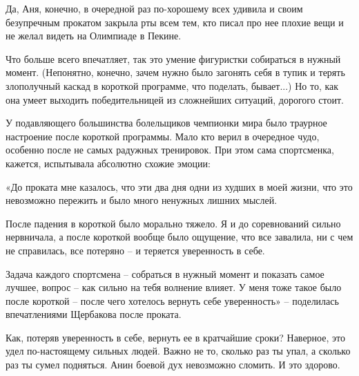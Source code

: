 Да, Аня, конечно, в очередной раз по-хорошему всех удивила и своим безупречным
прокатом закрыла рты всем тем, кто писал про нее плохие вещи и не желал видеть
на Олимпиаде в Пекине.

Что больше всего впечатляет, так это умение фигуристки собираться в нужный
момент. (Непонятно, конечно, зачем нужно было загонять себя в тупик и терять
злополучный каскад в короткой программе, что поделать, бывает...) Но то, как
она умеет выходить победительницей из сложнейших ситуаций, дорогого стоит.

У подавляющего большинства болельщиков чемпионки мира было траурное настроение
после короткой программы. Мало кто верил в очередное чудо, особенно после не
самых радужных тренировок. При этом сама спортсменка, кажется, испытывала
абсолютно схожие эмоции:

\begin{zznagolos}
«До проката мне казалось, что эти два дня одни из худших в моей жизни, что это
невозможно пережить и было много ненужных лишних мыслей.

После падения в короткой было морально тяжело. Я и до соревнований сильно
нервничала, а после короткой вообще было ощущение, что все завалила, ни с чем
не справилась, все потеряно – и теряется уверенность в себе.

Задача каждого спортсмена – собраться в нужный момент и показать самое лучшее,
вопрос – как сильно на тебя волнение влияет. У меня тоже такое было после
короткой – после чего хотелось вернуть себе уверенность» – поделилась
впечатлениями Щербакова после проката.	
\end{zznagolos}

Как, потеряв уверенность в себе, вернуть ее в кратчайшие сроки? Наверное, это
удел по-настоящему сильных людей. Важно не то, сколько раз ты упал, а сколько
раз ты сумел подняться. Анин боевой дух невозможно сломить. И это здорово.
